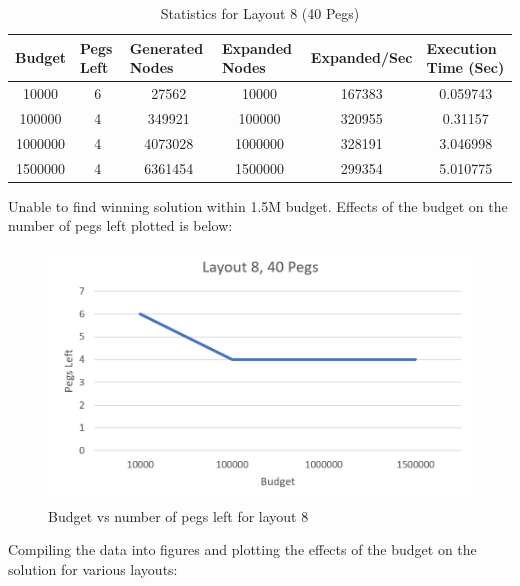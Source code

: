 \documentclass[12pt,a4paper]{article}
\begin{document}
\begin{table}[H]
\caption{Statistics for Layout 8 (40 Pegs)}
\label{tab:my-table}

\begin{tabular}{|c|c|c|c|c|c|}
\hline
Budget  & \multicolumn{1}{l|}{Pegs Left} & \multicolumn{1}{l|}{Generated Nodes} & \multicolumn{1}{l|}{Expanded Nodes} & \multicolumn{1}{l|}{Expanded/Sec} & \multicolumn{1}{l|}{Execution Time (Sec)} \\ \hline
10000   & 6                              & 27562                                & 10000                               & 167383                               & 0.059743                                              \\ \hline
100000  & 4                              & 349921                               & 100000                              & 320955                               & 0.31157                                               \\ \hline
1000000 & 4                              & 4073028                              & 1000000                             & 328191                               & 3.046998                                              \\ \hline
1500000 & 4                              & 6361454                              & 1500000                             & 299354                               & 5.010775                                              \\ \hline
\end{tabular}
\end{table}
Unable to find winning solution within 1.5M budget. Effects of the budget on the number of pegs left plotted is below:

\begin{figure}[H]
\centering
\includegraphics[scale=0.5]{layout8.png}
\caption{Budget vs number of pegs left for layout 8}
\end{figure}
Compiling the data into figures and plotting the effects of the budget on the solution for various layouts:
\end{document}
